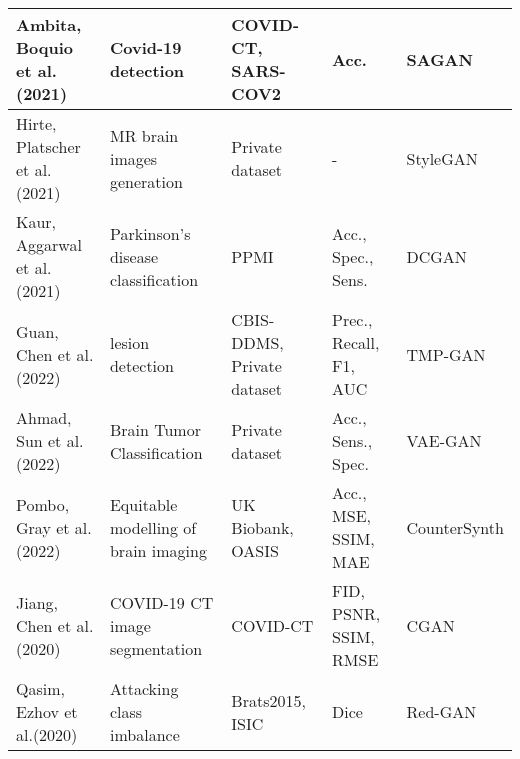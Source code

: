 \documentclass[preprint,12pt,authoryear]{elsarticle}
\begin{document}
{\begin{longtable}{|p{2cm}|p{3cm}|p{2cm}|p{2cm}|p{2cm}|}
Ambita, Boquio et al.(2021)\cite{apl8}        & Covid-19 detection                                        & COVID-CT, SARS-COV2                                               & Acc.                                                     & SAGAN                                     \\ \hline
Hirte, Platscher et al.(2021)\cite{apl9}      & MR brain images generation                                & Private dataset                                                   & -                                                        & StyleGAN                                  \\ \hline
Kaur, Aggarwal et al.(2021)\cite{apl10}       & Parkinson’s disease classification                        & PPMI                                                              & Acc., Spec., Sens.                                       & DCGAN                                     \\ \hline
Guan, Chen et al.(2022)\cite{apl11}           & lesion detection                                          & CBIS-DDMS, Private dataset                                        & Prec., Recall, F1, AUC                                   & TMP-GAN                                   \\ \hline
Ahmad, Sun et al.(2022)\cite{apl12}           & Brain Tumor Classification                                & Private dataset                                                   & Acc., Sens., Spec.                                       & VAE-GAN                                   \\ \hline
Pombo, Gray et al.(2022)\cite{apl13}          & Equitable modelling of brain imaging                      & UK Biobank, OASIS                                                 & Acc., MSE, SSIM, MAE                                     & CounterSynth                              \\ \hline
Jiang, Chen et al.(2020)\cite{apl14}          & COVID-19 CT image segmentation                            & COVID-CT                                                          & FID, PSNR, SSIM, RMSE                                    & CGAN                                      \\ \hline
Qasim, Ezhov et al.(2020)\cite{apl15}         & Attacking class imbalance                                 & Brats2015, ISIC                                                   & Dice                                                     & Red-GAN                                   \\ \hline

\end{longtable}}
\end{document}
